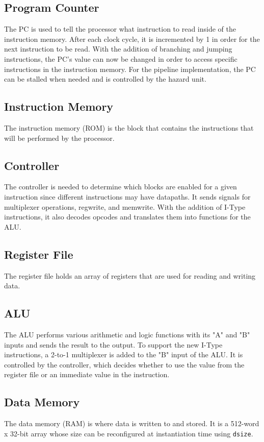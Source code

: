 \documentclass{article}
\begin{document}
	\subsection{Program Counter}
	The PC is used to tell the processor what instruction to read inside of the instruction memory. After each clock cycle, it is incremented by 1 in order for the next instruction to be read. With the addition of branching and jumping instructions, the PC's value can now be changed in order to access specific instructions in the instruction memory. For the pipeline implementation, the PC can be stalled when needed and is controlled by the hazard unit.
	
	\subsection{Instruction Memory}
	The instruction memory (ROM) is the block that contains the instructions that will be performed by the processor. 
	
  \subsection{Controller}
	The controller is needed to determine which blocks are enabled for a given instruction since different instructions may have datapaths. It sends signals for multiplexer operations, regwrite, and memwrite. With the addition of I-Type instructions, it also decodes opcodes and translates them into functions for the ALU. 
	
	\subsection{Register File}
	The register file holds an array of registers that are used for reading and writing data.
	
	\subsection{ALU}
	The ALU performs various arithmetic and logic functions with its "A" and "B" inputs and sends the result to the output. To support the new I-Type instructions, a 2-to-1 multiplexer is added to the "B" input of the ALU. It is controlled by the controller, which decides whether to use the value from the register file or an immediate value in the instruction.
	
	\subsection{Data Memory}
	The data memory (RAM) is where data is written to and stored. It is a 512-word x 32-bit array whose size can be reconfigured at instantiation time using \texttt{dsize}.
		
\end{document}
